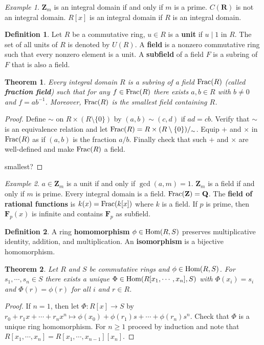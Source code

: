 \documentclass[11pt]{article}
\theoremstyle{definition}
\newtheorem*{defin}{Definition}
\theoremstyle{plain}
\newtheorem{theorem}{Theorem}
\theoremstyle{remark}
\newtheorem*{example}{Example}
\newcommand{\R}{\mathbf{R}}
\newcommand{\Z}{\mathbf{Z}}
\newcommand{\Frac}{\textup{Frac}}
\newcommand{\F}{\mathbf{F}}
\newcommand{\Hom}{\textup{Hom}}
\newcommand{\Q}{\mathbf{Q}}
\begin{document}
\begin{example}
$\Z_m$ is an integral domain if and only if $m$ is a prime. $C(\R)$ is not an integral domain. $R[x]$ is an integral domain if $R$ is an integral domain.
\end{example}

\begin{defin}
Let $R$ be a commutative ring, $u\in R$ is a \textbf{unit} if $u\mid1$ in $R$. The set of all units of $R$ is denoted by $U(R)$. A \textbf{field} is a nonzero commutative ring such that every nonzero element is a unit. A \textbf{subfield} of a field $F$ is a subring of $F$ that is also a field.
\end{defin}

\begin{theorem}
Every integral domain $R$ is a subring of a field $\Frac(R)$ (called \textbf{fraction field}) such that for any $f\in\Frac(R)$ there exists $a,b\in R$ with $b\neq0$ and $f=ab^{-1}$. Moreover, $\Frac(R)$ is the smallest field containing $R$.
\end{theorem}
\begin{proof}
Define $\sim$ on $R\times(R\setminus\{0\})$ by $(a,b)\sim(c,d)$ if $ad=cb$. Verify that $\sim$ is an equivalence relation and let $\Frac(R)=R\times(R\setminus\{0\})/_\sim$. Equip $+$ and $\times$ in $\Frac(R)$ as if $(a,b)$ is the fraction $a/b$. Finally check that such $+$ and $\times$ are well-defined and make $\Frac(R)$ a field.\medbreak

smallest?
\end{proof}

\begin{example}
$a\in\Z_m$ is a unit if and only if $\gcd(a,m)=1$. $\Z_m$ is a field if and only if $m$ is prime. Every integral domain is a field. $\Frac(\Z)=\Q$. The \textbf{field of rational functions} is $k(x)=\Frac(k[x])$ where $k$ is a field. If $p$ is prime, then $\F_p(x)$ is infinite and contains $\F_p$ as subfield.
\end{example}

\begin{defin}
A ring \textbf{homomorphism} $\phi\in\Hom(R,S)$ preserves multiplicative identity, addition, and multiplication. An \textbf{isomorphism} is a bijective homomorphism.
\end{defin}

\begin{theorem}
Let $R$ and $S$ be commutative rings and $\phi\in\Hom(R,S)$. For $s_1,\cdots,s_n\in S$ there exists a unique $\Phi\in\Hom(R[x_1,\cdots,x_n],S)$ with $\Phi(x_i)=s_i$ and $\Phi(r)=\phi(r)$ for all $i$ and $r\in R$.
\end{theorem}
\begin{proof}
If $n=1$, then let $\Phi:R[x]\to S$ by $r_0+r_1x+\cdots+r_nx^n\mapsto\phi(x_0)+\phi(r_1)s+\cdots+\phi(r_n)s^n$. Check that $\Phi$ is a unique ring homomorphism. For $n\geq1$ proceed by induction and note that $R[x_1,\cdots,x_n]=R[x_1,\cdots,x_{n-1}][x_n]$.
\end{proof}
\end{document}
